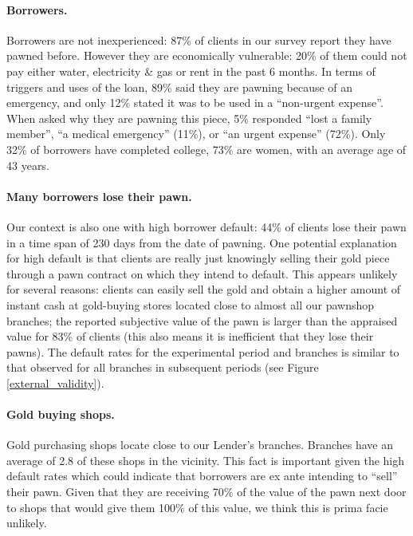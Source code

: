 \documentclass[12pt, a4paper, colorinlistoftodos]{article}
\begin{document}
\paragraph*{Borrowers.} Borrowers are not inexperienced: 87\% of clients in our survey report they have pawned before. %
However they are economically vulnerable:  20\% of them could not pay either water, electricity \& gas or rent in the past 6 months. In terms of triggers and uses of the loan, 89\% said they are pawning because of an emergency, and only 12\% stated it was to be used in a ``non-urgent expense''.  When asked why they are pawning this piece, 5\% responded ``lost a family member'', ``a medical emergency'' (11\%), or ``an urgent expense'' (72\%). Only 32\% of borrowers have completed college, 73\% are women, with an average age of 43 years.

\paragraph*{Many borrowers lose their pawn.}
Our context is also one with high borrower default: 44\% of clients lose their pawn in a time span of 230 days from the date of pawning. One potential explanation for high default is that clients are really just knowingly selling their gold piece through a pawn contract on which they intend to default. This appears unlikely for several reasons: clients can easily sell the gold and obtain a higher amount of instant cash at gold-buying stores located close to almost all our pawnshop branches;
the reported subjective value of the pawn is larger than the appraised value for 83\% of clients (this also means it is inefficient that they lose their pawns). The default rates for the experimental period and branches is similar to that observed for all branches in subsequent periods (see Figure \ref{external_validity}).  

\paragraph*{Gold buying shops.} Gold purchasing shops locate close to our Lender's branches. Branches have an average of 2.8 of these shops in the vicinity.  This fact is important given the high default rates which could indicate that borrowers are ex ante intending to ``sell'' their pawn.  Given that they are receiving 70\% of the value of the pawn next door to shops that would give them 100\% of this value, we think this is prima facie unlikely.
\end{document}
